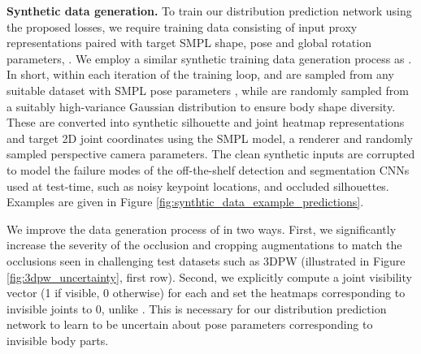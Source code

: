 \documentclass[final]{cvpr}
\begin{document}
\noindent \textbf{Synthetic data generation.} To train our distribution prediction network using the proposed losses, we require training data consisting of input proxy representations paired with target SMPL shape, pose and global rotation parameters, . We employ a similar synthetic training data generation process as \cite{STRAPS2020BMVC}. In short, within each iteration of the training loop,  and  are sampled from any suitable dataset with SMPL pose parameters \cite{h36m_pami,Lassner:UP:2017,AMASS:2019,vonMarcard2018}, while  are randomly sampled from a suitably high-variance Gaussian distribution to ensure body shape diversity. These are converted into synthetic silhouette and joint heatmap representations  and target 2D joint coordinates  using the SMPL model, a renderer \cite{kato2018renderer} and randomly sampled perspective camera parameters. The clean synthetic inputs are corrupted to model the failure modes of the off-the-shelf detection and segmentation CNNs used at test-time, such as noisy keypoint locations, and occluded silhouettes. Examples are given in Figure \ref{fig:synthtic_data_example_predictions}. 

We improve the data generation process of \cite{STRAPS2020BMVC} in two ways. First, we significantly increase the severity of the occlusion and cropping augmentations to match the occlusions seen in challenging test datasets such as 3DPW (illustrated in Figure \ref{fig:3dpw_uncertainty}, first row). Second, we explicitly compute a joint visibility vector  (1 if visible, 0 otherwise) for each  and set the heatmaps corresponding to invisible joints to 0, unlike \cite{STRAPS2020BMVC}. This is necessary for our distribution prediction network to learn to be uncertain about pose parameters corresponding to invisible body parts.
\end{document}
